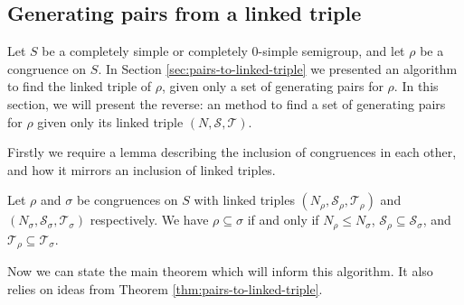 \subsection{Generating pairs from a linked triple}
\label{sec:linked-triple-to-pairs}

Let $S$ be a completely simple or completely 0-simple semigroup, and let $\rho$
be a congruence on $S$.  In Section \ref{sec:pairs-to-linked-triple} we
presented an algorithm to find the linked triple of $\rho$, given only a set of
generating pairs for $\rho$.  In this section, we will present the reverse: an
method to find a set of generating pairs for $\rho$ given only its linked triple
$(N, \mathcal{S}, \mathcal{T})$.

Firstly we require a lemma describing the inclusion of congruences in each
other, and how it mirrors an inclusion of linked triples.

\begin{lemma}
  \label{lem:linked-triple-subsets}
  Let $\rho$ and $\sigma$ be congruences on $S$ with linked triples
  $(N_\rho, \mathcal{S}_\rho, \mathcal{T}_\rho)$ and
  $(N_\sigma, \mathcal{S}_\sigma, \mathcal{T}_\sigma)$ respectively.
  We have $\rho \subseteq \sigma$ if and only if
  $N_\rho \leq N_\sigma$,
  $\mathcal{S}_\rho \subseteq \mathcal{S}_\sigma$, and
  $\mathcal{T}_\rho \subseteq \mathcal{T}_\sigma$.
\end{lemma}

Now we can state the main theorem which will inform this algorithm.  It also
relies on ideas from Theorem \ref{thm:pairs-to-linked-triple}.

